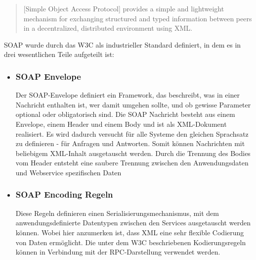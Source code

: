 \begin{quote}
\glqq{}[Simple Object Access Protocol] provides a simple and lightweight mechanism for exchanging structured and typed information between peers in a decentralized, distributed environment using XML.\grqq{} \autocite[][]{w3soa}
\end{quote}
\ac{SOAP} wurde durch das \ac{W3C} als industrieller Standard definiert, in dem es in drei wesentlichen Teile aufgeteilt ist:
\begin{itemize}
\item \subsubsection*{SOAP Envelope} 
Der \ac{SOAP}-Envelope definiert ein Framework, das beschreibt, was in einer Nachricht enthalten ist, wer damit umgehen sollte, und ob gewisse Parameter optional oder obligatorisch sind. Die \ac{SOAP} Nachricht besteht aus einem Envelope, einem Header und einem Body und ist als \ac{XML}-Dokument realisiert. Es wird dadurch versucht für alle Systeme den gleichen Sprachsatz zu definieren - für Anfragen und Antworten. Somit können Nachrichten mit beliebigem \ac{XML}-Inhalt ausgetauscht werden\autocite[Vgl.][]{w3soa}.
Durch die Trennung des Bodies vom Header entsteht eine saubere Trennung zwischen den Anwendungsdaten und Webservice spezifischen Daten\autocite[Vgl.][63\psq]{jws}

\item \subsubsection*{SOAP Encoding Regeln} 
Diese Regeln definieren einen Serialisierungsmechanismus, mit dem anwendungsdefinierte Datentypen zwischen den Services ausgetauscht werden können. Wobei hier anzumerken ist, dass \ac{XML} eine sehr flexible Codierung von Daten ermöglicht. Die unter dem \ac{W3C} beschriebenen Kodierungsregeln können in Verbindung mit der \ac{RPC}-Darstellung verwendet werden\autocite[Vgl.][]{w3soa}.


\end{itemize}
